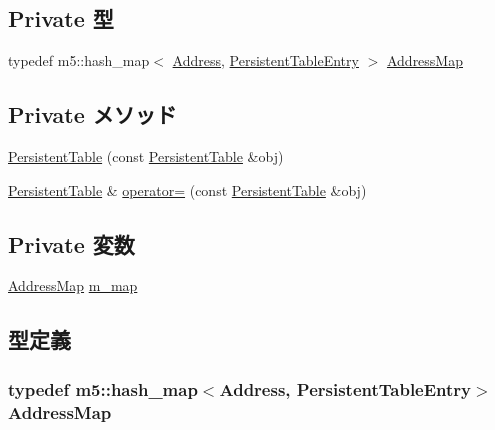 \subsection*{Private 型}
\begin{DoxyCompactItemize}
\item 
typedef m5::hash\_\-map$<$ \hyperlink{classAddress}{Address}, \hyperlink{classPersistentTableEntry}{PersistentTableEntry} $>$ \hyperlink{classPersistentTable_a4d7d821cf1f494582d40290d825c64aa}{AddressMap}
\end{DoxyCompactItemize}
\subsection*{Private メソッド}
\begin{DoxyCompactItemize}
\item 
\hyperlink{classPersistentTable_a0e21d362ba71e7ff415d1e7bdee72db4}{PersistentTable} (const \hyperlink{classPersistentTable}{PersistentTable} \&obj)
\item 
\hyperlink{classPersistentTable}{PersistentTable} \& \hyperlink{classPersistentTable_af4ed77850998cfdc187ce72c12864dfe}{operator=} (const \hyperlink{classPersistentTable}{PersistentTable} \&obj)
\end{DoxyCompactItemize}
\subsection*{Private 変数}
\begin{DoxyCompactItemize}
\item 
\hyperlink{classPersistentTable_a4d7d821cf1f494582d40290d825c64aa}{AddressMap} \hyperlink{classPersistentTable_a81aeb6fef4ddb55c4abc1662d977def1}{m\_\-map}
\end{DoxyCompactItemize}


\subsection{型定義}
\hypertarget{classPersistentTable_a4d7d821cf1f494582d40290d825c64aa}{
\subsubsection[{AddressMap}]{\setlength{\rightskip}{0pt plus 5cm}typedef m5::hash\_\-map$<${\bf Address}, {\bf PersistentTableEntry}$>$ {\bf AddressMap}}}
\label{classPersistentTable_a4d7d821cf1f494582d40290d825c64aa}



